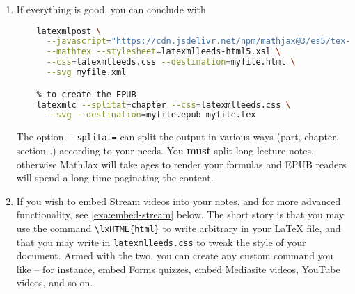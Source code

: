\documentclass[a4paper]{article}
\theoremstyle{definition}
\begin{document}
\begin{enumerate}
  \begin{lstlisting}[language=TeX]
    \iflatexml
      % code only executed by latexml
    \else
      % code only executed by the other engines
    \fi
  \end{lstlisting}
  \LaTeXML{} should be able to handle images, but it may choke on TikZ. Read the Vincenzo's \texttt{README} among the \href{https://leeds365.sharepoint.com/sites/TEAM-SchoolofMathematits/Shared%20Documents/Discussion%20-%20Digital%20accessibility/LaTeXML%20Examples}{\LaTeXML{} examples} of the \href{https://teams.microsoft.com/l/channel/19%3aef28f45e3a2e43e88bf416dd94b1c654%40thread.tacv2/Discussion%2520-%2520Digital%2520accessibility?groupId=88aa0346-1c2e-4ac1-bbcc-3d6395bc0a5b&tenantId=bdeaeda8-c81d-45ce-863e-5232a535b7cb}{Digital accessibility channel} for an automated TikZ workaround.
  \item If everything is good, you can conclude with
  \begin{lstlisting}[language=bash]
    % to create the final HTML
    latexmlpost \
      --javascript="https://cdn.jsdelivr.net/npm/mathjax@3/es5/tex-mml-chtml.js"\
      --mathtex --stylesheet=latexmlleeds-html5.xsl \
      --css=latexmlleeds.css --destination=myfile.html \
      --svg myfile.xml

    % to create the EPUB
    latexmlc --splitat=chapter --css=latexmlleeds.css \
      --svg --destination=myfile.epub myfile.tex
  \end{lstlisting}
  The option \verb|--splitat=| can split the output in various ways (part, chapter, section\dots{}) according to your needs. You \textbf{must} split long lecture notes, otherwise MathJax will take ages to render your formulas and EPUB readers will spend a long time paginating the content.
  \item If you wish to embed Stream videos into your notes, and for more advanced functionality, see \autoref{exa:embed-stream} below. The short story is that you may use the command \verb|\lxHTML{html}| to write arbitrary \HTML{} in your \LaTeX{} file, and that you may write in \verb|latexmlleeds.css| to tweak the style of your document. Armed with the two, you can create any custom command you like -- for instance, embed Forms quizzes, embed Mediasite videos, YouTube videos, and so on.
\end{enumerate}
\end{document}
